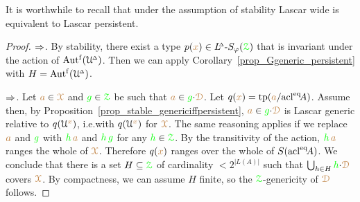 It is worthwhile to recall that under the assumption of stability Lascar wide is equivalent to Lascar persistent.

\begin{proof} 
  $\IMP$.
  By stability, there exist a type $p({\mr x})\in\LDelta\mbox{-}S_\phi(\grZ)$ that is invariant under the action of $\Autf(\UDelta)$.
  Then we can apply Corollary~\ref{prop_Ggeneric_persistent} with $H=\Autf(\UDelta)$.

  $\IMP$.
  Let ${\mr a}\in\mrX$ and ${\gr g}\in\grZ$ be such that ${\mr a}\in{\gr g}{\cdot}\mrD$.
  Let $q({\mr x})=\tp({\mr a}/\acl^\eq\!A)$.
  Assume  then, by Proposition~\ref{prop_stable_genericiffpersistent}, ${\mr a}\in{\gr g}{\cdot}\mrD$ is Lascar generic relative to $q(\U^{\mr x})$, i.e.\@ with $q(\U^{\mr x})$ for $\mrX$.
  The same reasoning applies if we replace ${\mr a}$ and ${\gr g}$ with  ${\gr h}\,{\mr a}$ and ${\gr h}\,{\gr g}$ for any ${\gr h}\in\grZ$.
  By the transitivity of the action, ${\gr h}\,{\mr a}$ ranges the whole of $\mrX$.
  Therefore $q({\mr x})$ ranges over the whole of $S(\acl^\eq\!A)$.
  We conclude that there is a set $H\subseteq\grZ$ of cardinality $<2^{|L(A)|}$ such that $\bigcup_{h\in H}{\gr h}{\cdot}\mrD$ covers $\mrX$.
  By compactness, we can assume $H$ finite, so the $\grZ$-genericity of $\mrD$ follows.
\end{proof}


